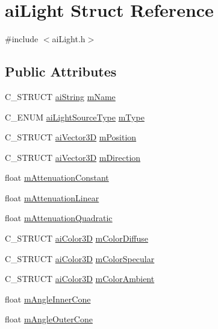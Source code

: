\hypertarget{structai_light}{\section{ai\-Light Struct Reference}
\label{structai_light}
}


{\ttfamily \#include $<$ai\-Light.\-h$>$}

\subsection*{Public Attributes}
\begin{DoxyCompactItemize}
\item 
C\-\_\-\-S\-T\-R\-U\-C\-T \hyperlink{structai_string}{ai\-String} \hyperlink{structai_light_a92806413f16230728b04e5f379fd00c0}{m\-Name}
\item 
C\-\_\-\-E\-N\-U\-M \hyperlink{ai_light_8h_a7a75cb224d903e71e8daede432449766}{ai\-Light\-Source\-Type} \hyperlink{structai_light_a4cba1741875dd92724ff55be91c60c2b}{m\-Type}
\item 
C\-\_\-\-S\-T\-R\-U\-C\-T \hyperlink{structai_vector3_d}{ai\-Vector3\-D} \hyperlink{structai_light_a5daf9c9ad2613603b847a527123611f0}{m\-Position}
\item 
C\-\_\-\-S\-T\-R\-U\-C\-T \hyperlink{structai_vector3_d}{ai\-Vector3\-D} \hyperlink{structai_light_af3776d5e4e6065cb6dd7e10dc656dada}{m\-Direction}
\item 
float \hyperlink{structai_light_ae8804b3c309527ca0f85d676bab55710}{m\-Attenuation\-Constant}
\item 
float \hyperlink{structai_light_aefda311eaa785ea345782dfa95be817c}{m\-Attenuation\-Linear}
\item 
float \hyperlink{structai_light_ab4fb07bfa40a807661b1ed1791838a6d}{m\-Attenuation\-Quadratic}
\item 
C\-\_\-\-S\-T\-R\-U\-C\-T \hyperlink{structai_color3_d}{ai\-Color3\-D} \hyperlink{structai_light_a22e7feebbfaf53adf73bd9f581636efd}{m\-Color\-Diffuse}
\item 
C\-\_\-\-S\-T\-R\-U\-C\-T \hyperlink{structai_color3_d}{ai\-Color3\-D} \hyperlink{structai_light_aa79ae6ad6a10f0cb9c740e23b6bb01bf}{m\-Color\-Specular}
\item 
C\-\_\-\-S\-T\-R\-U\-C\-T \hyperlink{structai_color3_d}{ai\-Color3\-D} \hyperlink{structai_light_a5188b60e6fbaf1635fa780913508e3cd}{m\-Color\-Ambient}
\item 
float \hyperlink{structai_light_abad0466811938623e98bf1d334143f9a}{m\-Angle\-Inner\-Cone}
\item 
float \hyperlink{structai_light_a20fd332a5f9d8e8cb94816ff2b0ae7f4}{m\-Angle\-Outer\-Cone}
\end{DoxyCompactItemize}


